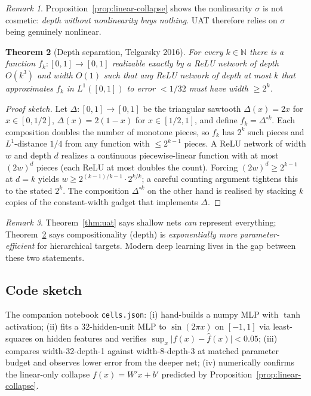 \documentclass[11pt]{article}
\newtheorem{theorem}{Theorem}[section]
\theoremstyle{remark}
\newtheorem{remark}[theorem]{Remark}
\begin{document}
\begin{remark}
Proposition~\ref{prop:linear-collapse} shows the nonlinearity $\sigma$ is not cosmetic: \emph{depth without nonlinearity buys nothing}. UAT therefore relies on $\sigma$ being genuinely nonlinear.
\end{remark}

\begin{theorem}[Depth separation, Telgarsky 2016]\label{thm:depth}
For every $k \in \mathbb{N}$ there is a function $f_k : [0,1] \to [0,1]$ realizable \emph{exactly} by a ReLU network of depth $O(k^3)$ and width $O(1)$ such that any ReLU network of depth at most $k$ that approximates $f_k$ in $L^1([0,1])$ to error $< 1/32$ must have width $\geq 2^k$.
\end{theorem}

\begin{proof}[Proof sketch]
Let $\Delta : [0,1] \to [0,1]$ be the triangular sawtooth $\Delta(x) = 2x$ for $x \in [0, 1/2]$, $\Delta(x) = 2(1-x)$ for $x \in [1/2, 1]$, and define $f_k = \Delta^{\circ k}$. Each composition doubles the number of monotone pieces, so $f_k$ has $2^k$ such pieces and $L^1$-distance $1/4$ from any function with $\leq 2^{k-1}$ pieces. A ReLU network of width $w$ and depth $d$ realizes a continuous piecewise-linear function with at most $(2w)^d$ pieces (each ReLU at most doubles the count). Forcing $(2w)^d \geq 2^{k-1}$ at $d = k$ yields $w \geq 2^{(k-1)/k - 1} \cdot 2^{k/k}$; a careful counting argument tightens this to the stated $2^k$. The composition $\Delta^{\circ k}$ on the other hand is realised by stacking $k$ copies of the constant-width gadget that implements $\Delta$.
\end{proof}

\begin{remark}
Theorem~\ref{thm:uat} says shallow nets \emph{can} represent everything; Theorem~\ref{thm:depth} says compositionality (depth) is \emph{exponentially more parameter-efficient} for hierarchical targets. Modern deep learning lives in the gap between these two statements.
\end{remark}

\subsection*{Code sketch}

The companion notebook \texttt{cells.json}: (i) hand-builds a numpy MLP with $\tanh$ activation; (ii) fits a 32-hidden-unit MLP to $\sin(2\pi x)$ on $[-1,1]$ via least-squares on hidden features and verifies $\sup_x \lvert f(x) - \hat f(x)\rvert < 0.05$; (iii) compares width-32-depth-1 against width-8-depth-3 at matched parameter budget and observes lower error from the deeper net; (iv) numerically confirms the linear-only collapse $f(x) = W' x + b'$ predicted by Proposition~\ref{prop:linear-collapse}.
\end{document}
